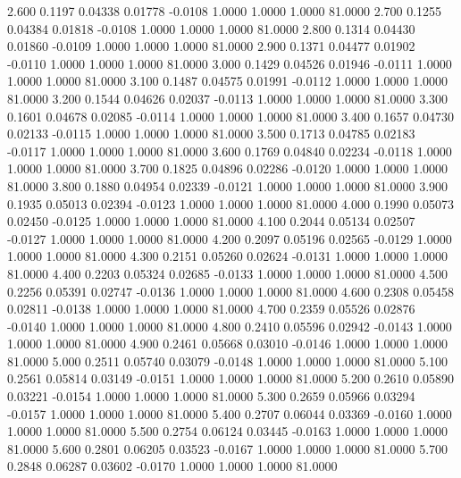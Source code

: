    2.600   0.1197   0.04338   0.01778  -0.0108   1.0000   1.0000   1.0000  81.0000
   2.700   0.1255   0.04384   0.01818  -0.0108   1.0000   1.0000   1.0000  81.0000
   2.800   0.1314   0.04430   0.01860  -0.0109   1.0000   1.0000   1.0000  81.0000
   2.900   0.1371   0.04477   0.01902  -0.0110   1.0000   1.0000   1.0000  81.0000
   3.000   0.1429   0.04526   0.01946  -0.0111   1.0000   1.0000   1.0000  81.0000
   3.100   0.1487   0.04575   0.01991  -0.0112   1.0000   1.0000   1.0000  81.0000
   3.200   0.1544   0.04626   0.02037  -0.0113   1.0000   1.0000   1.0000  81.0000
   3.300   0.1601   0.04678   0.02085  -0.0114   1.0000   1.0000   1.0000  81.0000
   3.400   0.1657   0.04730   0.02133  -0.0115   1.0000   1.0000   1.0000  81.0000
   3.500   0.1713   0.04785   0.02183  -0.0117   1.0000   1.0000   1.0000  81.0000
   3.600   0.1769   0.04840   0.02234  -0.0118   1.0000   1.0000   1.0000  81.0000
   3.700   0.1825   0.04896   0.02286  -0.0120   1.0000   1.0000   1.0000  81.0000
   3.800   0.1880   0.04954   0.02339  -0.0121   1.0000   1.0000   1.0000  81.0000
   3.900   0.1935   0.05013   0.02394  -0.0123   1.0000   1.0000   1.0000  81.0000
   4.000   0.1990   0.05073   0.02450  -0.0125   1.0000   1.0000   1.0000  81.0000
   4.100   0.2044   0.05134   0.02507  -0.0127   1.0000   1.0000   1.0000  81.0000
   4.200   0.2097   0.05196   0.02565  -0.0129   1.0000   1.0000   1.0000  81.0000
   4.300   0.2151   0.05260   0.02624  -0.0131   1.0000   1.0000   1.0000  81.0000
   4.400   0.2203   0.05324   0.02685  -0.0133   1.0000   1.0000   1.0000  81.0000
   4.500   0.2256   0.05391   0.02747  -0.0136   1.0000   1.0000   1.0000  81.0000
   4.600   0.2308   0.05458   0.02811  -0.0138   1.0000   1.0000   1.0000  81.0000
   4.700   0.2359   0.05526   0.02876  -0.0140   1.0000   1.0000   1.0000  81.0000
   4.800   0.2410   0.05596   0.02942  -0.0143   1.0000   1.0000   1.0000  81.0000
   4.900   0.2461   0.05668   0.03010  -0.0146   1.0000   1.0000   1.0000  81.0000
   5.000   0.2511   0.05740   0.03079  -0.0148   1.0000   1.0000   1.0000  81.0000
   5.100   0.2561   0.05814   0.03149  -0.0151   1.0000   1.0000   1.0000  81.0000
   5.200   0.2610   0.05890   0.03221  -0.0154   1.0000   1.0000   1.0000  81.0000
   5.300   0.2659   0.05966   0.03294  -0.0157   1.0000   1.0000   1.0000  81.0000
   5.400   0.2707   0.06044   0.03369  -0.0160   1.0000   1.0000   1.0000  81.0000
   5.500   0.2754   0.06124   0.03445  -0.0163   1.0000   1.0000   1.0000  81.0000
   5.600   0.2801   0.06205   0.03523  -0.0167   1.0000   1.0000   1.0000  81.0000
   5.700   0.2848   0.06287   0.03602  -0.0170   1.0000   1.0000   1.0000  81.0000
